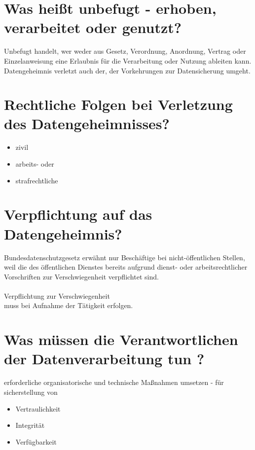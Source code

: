 \documentclass[a4paper,10pt]{scrartcl}
\begin{document}
\section{Was heißt unbefugt - erhoben, verarbeitet oder genutzt?}

Unbefugt handelt, wer weder aus Gesetz, Verordnung, 
Anordnung, Vertrag oder Einzelanweisung eine Erlaubnis für die 
Verarbeitung oder Nutzung ableiten kann. 
Datengeheimnis verletzt auch der, der Vorkehrungen zur 
Datensicherung umgeht. 

\section{Rechtliche Folgen bei Verletzung des Datengeheimnisses?}

\begin{itemize}
 \item zivil
 \item arbeits- oder 
 \item strafrechtliche
\end{itemize}

\section{Verpflichtung auf das Datengeheimnis?}

Bundesdatenschutzgesetz erwähnt nur Beschäftige bei 
nicht-öffentlichen Stellen, weil die des öffentlichen 
Dienstes bereits aufgrund dienst- oder arbeitsrechtlicher 
Vorschriften zur Verschwiegenheit verpflichtet sind.\\
\\
Verpflichtung zur Verschwiegenheit \\
muss bei Aufnahme der Tätigkeit erfolgen.

\section{Was müssen die Verantwortlichen der 
Datenverarbeitung tun ?}

erforderliche organisatorische und technische Maßnahmen umsetzen - für sicherstellung von

\begin{itemize}
 \item Vertraulichkeit
 \item Integrität
 \item Verfügbarkeit
\end{itemize}
\end{document}
